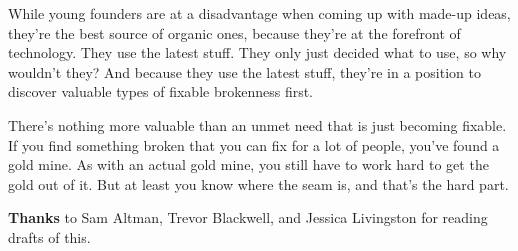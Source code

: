 While young founders are at a disadvantage when coming up with made-up
ideas, they're the best source of organic ones, because they're at the
forefront of technology. They use the latest stuff. They only just
decided what to use, so why wouldn't they? And because they use the
latest stuff, they're in a position to discover valuable types of
fixable brokenness first.

There's nothing more valuable than an unmet need that is just becoming
fixable. If you find something broken that you can fix for a lot of
people, you've found a gold mine. As with an actual gold mine, you still
have to work hard to get the gold out of it. But at least you know where
the seam is, and that's the hard part.


\textbf{Thanks} to Sam Altman, Trevor Blackwell, and Jessica Livingston
for reading drafts of this.